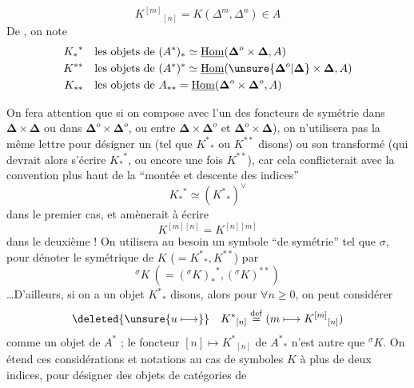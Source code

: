 \[ {K^{[m]}}_{[n]}=K(\Delta^m,\Delta^n)\in A \]
De , on note
\[
\begin{aligned}
{K_*}^*&\quad\text{les objets de }(A^*)_*\simeq\underline{\operatorname{Hom}}(\boldsymbol\Delta^o\times\boldsymbol\Delta,A)\\
K^{**}&\quad\text{les objets de }(A^*)^*\simeq\underline{\operatorname{Hom}}(\unsure{\boldsymbol\Delta^o|\boldsymbol\Delta}\times\boldsymbol\Delta,A)\\
K_{**}&\quad\text{les objets de }A_{**}=\underline{\operatorname{Hom}}(\boldsymbol\Delta^o\times\boldsymbol\Delta^o,A)
\end{aligned}
\]

On fera attention que si on compose avec l'un des foncteurs de symétrie
dans $\boldsymbol\Delta\times\boldsymbol\Delta$ ou dans $\boldsymbol\Delta^o\times\boldsymbol\Delta^o$, ou entre $\boldsymbol\Delta\times\boldsymbol\Delta^o$ et $\boldsymbol\Delta^o\times\boldsymbol\Delta$), on n'utilisera pas la même lettre pour désigner un   (tel que ${K^*}_*$ ou $K^{**}$ disons) ou son transformé (qui devrait alors s'écrire ${K_*}^*$, ou encore une fois $K^{**}$), car cela conflicterait avec la convention plus haut de la ``montée et descente des indices''
\[ {K_*}^*\simeq({K^*}_*)^\vee \]
dans le premier cas, et  amènerait à écrire
\[ K^{[m][n]}=K^{[n][m]} \]
dans le deuxième ! On utilisera au besoin un symbole ``de symétrie'' tel que $\sigma$, pour dénoter le symétrique de $K$ ($={K^*}_*,K^{**}$) par
\[ {}^\sigma K\ (= {({}^\sigma K)_*}^*,({}^\sigma K)^{**}) \]
 \ldots D'ailleurs,
si on a un objet ${K^*}_*$ disons,  alors pour $\forall n\geq0$, on peut considérer
\[
\deleted{\unsure{u\longmapsto}}\quad
{K^*}_{[n]}\overset{\mathrm{def}}{=}(m\longmapsto {K^{[m]}}_{[n]})
\]
comme un objet de $A^*$ ; le foncteur $[n]\longmapsto {K^*}_{[n]}$ de ${A^*}_*$ n'est autre que ${}^\sigma K$.
On étend ces considérations et notations au cas de symboles $K$ à plus de deux indices, pour désigner des objets de catégories de

